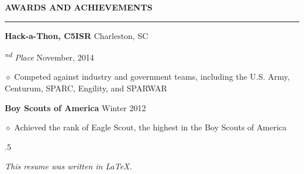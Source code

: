 \documentclass[executivepaper]{extarticle}
\begin{document}
\begin{center}
{\begin{minipage}{7.0in}

{\noindent \textbf{\fontsize{10}{9}\selectfont AWARDS AND ACHIEVEMENTS}}

\vspace{-3mm}

\noindent \rule{\textwidth}{0.5pt}

\vspace{-1mm}

{\noindent \textbf{\fontsize{9}{8}\selectfont Hack-a-Thon, C5ISR}} {\hfill \fontsize{9}{8}\selectfont Charleston, SC}

{\noindent \textit{\fontsize{9}{8}\textsuperscript{nd} Place}} {\hfill \fontsize{9}{8}\selectfont November, 2014}

{\noindent $\diamond$ {\fontsize{9}{8}\selectfont Competed against industry and government teams, including the U.S. Army, Centurum, SPARC, Engility, and SPARWAR}}

{\noindent \textbf{\fontsize{9}{8}\selectfont Boy Scouts of America}} {\hfill \fontsize{9}{8}\selectfont Winter 2012}

{\noindent $\diamond$ {\fontsize{9}{8}\selectfont Achieved the rank of Eagle Scout, the highest in the Boy Scouts of America}}

\vspace{5mm}



\moveleft.5\hoffset\centerline{{\small\sl This resume was written in \LaTeX.}}

\end{minipage}

}

\end{center}
\end{document}
